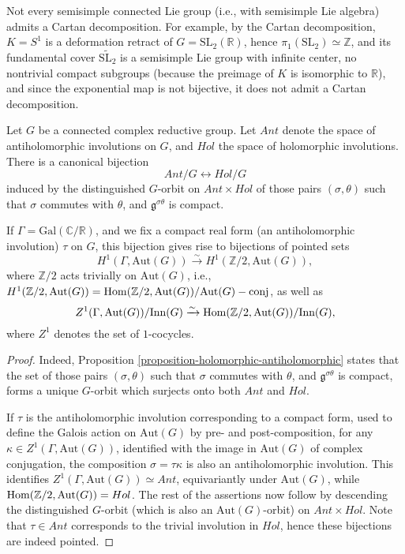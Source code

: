 \begin{remark}
 \label{remark-no-Cartan}
Not every semisimple connected Lie group (i.e., with semisimple Lie algebra) admits a Cartan decomposition. For example, by the Cartan decomposition, $K=S^1$ is a deformation retract of $G=\text{SL}_2(\mathbb R)$, hence $\pi_1(\text{SL}_2) \simeq \mathbb Z$, and its fundamental cover $\widetilde{\text{SL}_2}$ is a semisimple Lie group with infinite center, no nontrivial compact subgroups (because the preimage of $K$ is isomorphic to $\mathbb R$), and since the exponential map is not bijective, it does not admit a Cartan decomposition. 
\end{remark}



\begin{theorem}
\label{theorem-holomorphic-antiholomorphic}
Let $G$ be a connected complex reductive group. Let $Ant$ denote the space of antiholomorphic involutions on $G$, and $Hol$ the space of holomorphic involutions. There is a canonical bijection 
$$Ant/G \leftrightarrow Hol/G$$
induced by the distinguished $G$-orbit on $Ant \times Hol$ of those pairs $(\sigma,\theta)$ such that $\sigma$ commutes with $\theta$, and $\mathfrak g^{\sigma\theta}$ is compact.

If $\Gamma =\text{Gal}(\mathbb C/\mathbb R)$, and we fix a compact real form (an antiholomorphic involution) $\tau$ on $G$, this bijection gives rise to bijections of pointed sets
$$H^1(\Gamma, \text{Aut}(G)) \xrightarrow\sim H^1(\mathbb Z/2, \text{Aut}(G)),$$
where $\mathbb Z/2$ acts trivially on $\text{Aut}(G)$, i.e., \\ $H^1(\mathbb Z/2, \text{Aut}(G)) = \mathop{\rm Hom}\nolimits(\mathbb Z/2, \text{Aut}(G))/\text{Aut}(G)-\text{conj}$, as well as
$$Z^1(\Gamma, \text{Aut}(G))/\text{Inn}(G) \xrightarrow\sim \mathop{\rm Hom}\nolimits(\mathbb Z/2, \text{Aut}(G))/\text{Inn}(G),$$
where $Z^1$ denotes the set of $1$-cocycles.
\end{theorem}

\begin{proof}
 Indeed, Proposition \ref{proposition-holomorphic-antiholomorphic} states that the set of those pairs $(\sigma,\theta)$ such that $\sigma$ commutes with $\theta$, and $\mathfrak g^{\sigma\theta}$ is compact, forms a unique $G$-orbit which surjects onto both $Ant$ and $Hol$. 
 
 If $\tau$ is the antiholomorphic involution corresponding to a compact form, used to define the Galois action on $\text{Aut}(G)$ by pre- and post-composition, for any $\kappa \in Z^1(\Gamma, \text{Aut}(G))$, identified with the image in $\text{Aut}(G)$ of complex conjugation, the composition $\sigma = \tau\kappa$ is also an antiholomorphic involution. This identifies $Z^1(\Gamma, \text{Aut}(G)) \simeq Ant$, equivariantly under $\text{Aut}(G)$, while $\mathop{\rm Hom}\nolimits(\mathbb Z/2, \text{Aut}(G)) = Hol$. The rest of the assertions now follow by descending the distinguished $G$-orbit (which is also an $\text{Aut}(G)$-orbit) on $Ant \times Hol$. Note that $\tau \in Ant$ corresponds to the trivial involution in $Hol$, hence these bijections are indeed pointed.
\end{proof}

